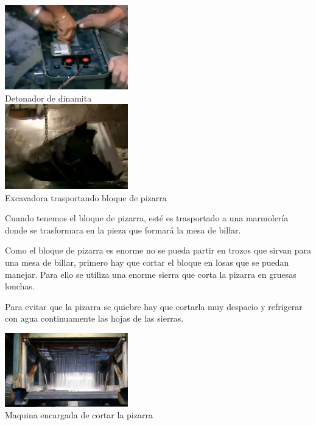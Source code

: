 	\begin{center}
	    		\includegraphics[width=0.4\textwidth]{Pantallazo-1.png}			
    \\ \small {Detonador de dinamita} \\[0.5cm]
\includegraphics[width=0.4\textwidth]{Pantallazo-2.png} 
\\ \small {Excavadora trasportando bloque de pizarra}
	\end{center}

 Cuando tenemos el bloque de pizarra, esté es trasportado a una marmolería donde se trasformara en la pieza que formará la mesa de billar.


Como el bloque de pizarra es enorme  no se pueda partir  en trozos que sirvan para una mesa de billar, primero hay que cortar el bloque en losas que se puedan manejar. Para ello se utiliza una enorme sierra que corta la pizarra en gruesas lonchas. 

Para evitar que la pizarra se quiebre hay que cortarla muy despacio y refrigerar con agua continuamente las hojas de las sierras. 
	\begin{center}
	    		\includegraphics[width=0.4\textwidth]{Pantallazo-3.png}
\\ \small {Maquina encargada de cortar la pizarra}
	\end{center}


